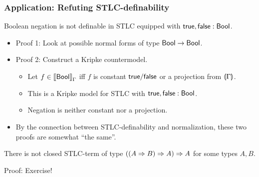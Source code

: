 \documentclass[t,fleqn,usenames,dvipsnames]{beamer}
\begin{document}
\begin{frame}%
  \frametitle{Application: Refuting STLC-definability}
  \vspace{-3ex}
  \begin{theorem}
    Boolean negation is not definable in STLC equipped with $\mathsf{true},
    \mathsf{false} : \mathsf{Bool}$.
  \end{theorem}
  \begin{itemize}
  \item Proof 1: Look at possible normal forms of type $\mathsf{Bool} \to
    \mathsf{Bool}$.
  \item Proof 2: Construct a Kripke countermodel.
    \begin{itemize}
    \item Let $f \in \mathopen{{[\kern-0.14em[}} \mathsf{Bool} \mathclose{{]\kern-0.14em]}}_{\Gamma}$ iff $f$ is constant
      $\mathsf{true}/\mathsf{false}$ or a projection from $\llparenthesis\Gamma\rrparenthesis$.
    \item This is a Kripke model for STLC with $\mathsf{true},
    \mathsf{false} : \mathsf{Bool}$.
    \item Negation is neither constant nor a projection.
    \end{itemize}
  \item By the connection between STLC-definability and normalization,
    these two proofs are somewhat ``the same''.
  \end{itemize}
  \begin{theorem}
    There is not closed STLC-term of type
    $((A \Rightarrow B) \Rightarrow A) \Rightarrow A$ %
    for some types $A,B$.
  \end{theorem}
  Proof: Exercise!
\end{frame}
\end{document}
